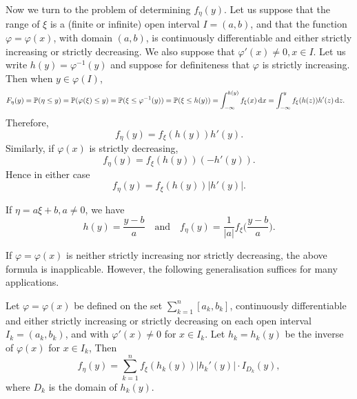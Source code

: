 Now we turn to the problem of determining $f_\eta(y)$. Let us suppose that the range of $\xi$ is a (finite or infinite) open interval $I = (a,b)$, and that the function $\varphi = \varphi(x)$, with domain $(a,b)$, is continuously differentiable and either strictly increasing or strictly decreasing. We also suppose that $\varphi'(x) \ne 0, x\in I$. Let us write $h(y) = \varphi^{-1}(y)$ and suppose for definiteness that $\varphi$ is strictly increasing. Then when $y \in \varphi(I)$,
\begin{align*}
    F_\eta(y) = \mathbb{P}(\eta \le y) = \mathbb{P}(\varphi(\xi) \le y) = \mathbb{P}(\xi \le \varphi^{-1}(y)) &= \mathbb{P}(\xi \le h(y))
    = \int_{-\infty}^{h(y)}f_\xi(x)\, \mathrm{d} x
    = \int_{-\infty}^y f_\xi(h(z))h'(z)\, \mathrm{d} z.
\end{align*}
Therefore,
\begin{equation}
    f_\eta(y) = f_\xi(h(y))h'(y).
\end{equation}
Similarly, if $\varphi(x)$ is strictly decreasing,
\begin{equation}
    f_\eta(y) = f_\xi(h(y))(-h'(y)).
\end{equation}
Hence in either case
\begin{equation}
    f_\eta(y) = f_\xi(h(y))|h'(y)|.
\end{equation}
\begin{example}
If $\eta = a\xi + b, a\ne 0$, we have
\begin{equation}
    h(y) = \frac{y-b}{a} \quad \text{and} \quad f_\eta(y) = \frac{1}{|a|}f_\xi\bigg(\frac{y-b}{a} \bigg).
\end{equation}
\end{example}
If $\varphi = \varphi(x)$ is neither strictly increasing nor strictly decreasing, the above formula is inapplicable. However, the following generalisation suffices for many applications.
\begin{lemma}
Let $\varphi = \varphi(x)$ be defined on the set $\sum_{k=1}^n[a_k, b_k]$, continuously differentiable and either strictly increasing or strictly decreasing on each open interval $I_k = (a_k, b_k)$, and with $\varphi'(x) \ne 0$ for $x \in I_k$. Let $h_k = h_k(y)$ be the inverse of $\varphi(x)$ for $x \in I_k$, Then
\begin{equation}
    f_\eta(y) = \sum_{k=1}^n f_\xi(h_k(y))|h_k'(y)|\cdot I_{D_k}(y),
\end{equation}
where $D_k$ is the domain of $h_k(y)$.
\end{lemma}
